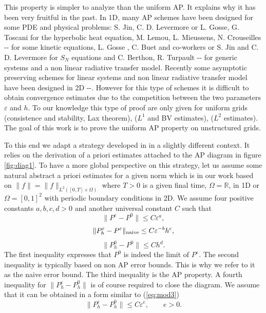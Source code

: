 \documentclass[a4paper,french,english,10pt]{article}
\newcommand\eps{\varepsilon}
\begin{document}
This property is simpler to analyze than the uniform AP. It explains
why it has been very fruitful in the past.
In 1D, many AP schemes have been designed for some PDE and physical problems: S.
Jin, C. D. Levermore \cite{jinlev} or L. Gosse, G. Toscani \cite{Gosse} for the
hyperbolic heat equation, M. Lemou, L. Mieussens, N. Crouseilles
\cite{lemou}-\cite{MMvlasov}-\cite{couplingRad} for some kinetic equations, L.
Gosse \cite{GosseSn}, C. Buet and co-workers \cite{buet} or S. Jin and C. D.
Levermore \cite{SnJin} for $S_N$ equations and C. Berthon, R. Turpault
\cite{ber1}-\cite{ber3}-\cite{ber4} for generic systems and a non linear
radiative transfer model. Recently some asymptotic preserving schemes for linear
systems and non linear radiative transfer model have been designed in 2D
\cite{glaceap}-\cite{cras}-\cite{FVCA6}. However for this type of schemes it is
 difficult to obtain convergence estimates due to the competition between
the two parameters $\eps$ and $h$. To our knowledge this type of
proof are only given for uniform grids \cite{glaceap} (consistence and
stability, Lax theorem), \cite{Gosse} ($L^1$ and BV estimates), \cite{mmcv}
($L^2$ estimates).
The goal of this work is to prove the uniform AP property on unstructured 
grids.

To this end we adapt a strategy developed in 
 \cite{cveps} in a slightly different context.
It relies on the derivation of a priori estimates attached to the AP diagram in figure
\ref{fig:diag1}. To have a more global perspective
on this strategy,  let us assume 
some natural abstract a priori  estimates for a given norm
which is in our work based on   $\|f\|=\|f\|_{L^2([0,T]\times \Omega ) }$
where $T>0$ is a given final time, $\Omega=\mathbb{R}$, in 1D or $\Omega=[0,1]^2$ with periodic boundary conditions in 2D.
We assume four positive constants $a,b,c,d>0$ and another universal constant
 $C$ such that 
\begin{equation}\label{eq:mod3}
\| P^\varepsilon - P^0 \| \leq
C \varepsilon ^{a},
\end{equation}
\begin{equation}\label{eq:mod7}
\| P_h^\varepsilon - P^\varepsilon   \|_{ {\rm naive}} \leq
C \varepsilon ^{-b}h^c,
\end{equation}
\begin{equation}\label{eq:mod4}
\| P_h^0 - P^0   \| \leq
C h^d.
\end{equation}
The first inequality expresses that $P^0$ is indeed the limit of
$P^\varepsilon$. 
The second inequality is typically
based on  non AP error bounds. This is why we refer
to it as the naive error bound. 
The third inequality is the AP property.
A fourth inequality for
$\| P_h^\eps-P_h^0\|$ 
is of course
required to close the diagram.
We assume that it can be obtained in a form similar to 
(\ref{eq:mod3})
\begin{equation}\label{eq:mod3-bis}
\| P^\varepsilon_h - P^0_h \| \leq
C  \varepsilon ^{e}, \qquad e>0.
\end{equation}
\end{document}
